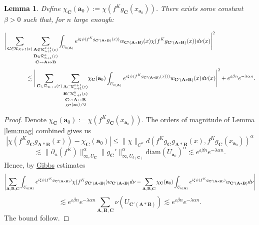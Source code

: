 \documentclass[a4paper]{article}
\newtheorem{lemma}[theorem]{Lemma}
\theoremstyle{definition}
\begin{document}
\begin{lemma}

Define $ \chi_{\mathbf{C}}(\mathbf{a}_0) := \chi(f^K g_{\mathbf{C}}(x_{\mathbf{a}_0}))$. There exists some constant $\beta>0$ such that, for $n$ large enough:

$$  \Bigg{|}\sum_{\mathbf{C} \in \mathcal{R}_{K+1}(\varepsilon)} \underset{\mathbf{C} \rightsquigarrow \mathbf{A} \leftrightarrow \mathbf{B}}{ \underset{ \mathbf{B} \in \mathcal{R}_{n+1}^k(\varepsilon)}{ \underset{\mathbf{A} \in \mathcal{R}_{n+1}^{k+1}(\varepsilon) }{ \sum}} } \int_{U_{b(\mathbf{A})}} e^{i \xi \psi( f^K g_{\mathbf{C}'(\mathbf{A} * \mathbf{B})}(x))} w_{\mathbf{C}'(\mathbf{A} * \mathbf{B})}(x) \chi(f^K g_{\mathbf{C}'(\mathbf{A} * \mathbf{B})}(x)) d\nu(x) \Bigg{|}^2  \quad \quad \quad \quad \quad \quad \quad $$ $$ \quad \quad \quad \quad  \lesssim  \Bigg{|} \sum_{\mathbf{C} \in \mathcal{R}_{K+1}(\varepsilon)} \underset{\chi_{\mathbf{C}}(\mathbf{a}_0) \neq 0}{\underset{\mathbf{C} \rightsquigarrow \mathbf{A} \leftrightarrow \mathbf{B}}{ \underset{ \mathbf{B} \in \mathcal{R}_{n+1}^k(\varepsilon)}{ \underset{\mathbf{A} \in \mathcal{R}_{n+1}^{k+1}(\varepsilon) }{ \sum}} }} \chi_{\mathbf{C}}(\mathbf{a}_0) \int_{U_{b(\mathbf{A})}} e^{i \xi \psi( f^K g_{\mathbf{C}'(\mathbf{A} * \mathbf{B})}(x)))} w_{\mathbf{C}'(\mathbf{A} * \mathbf{B})}(x) d\nu(x) \Bigg{|}^2 + e^{\varepsilon \beta n} e^{- \lambda \alpha n}. $$

\end{lemma}

\begin{proof}
Denote $ \chi_{\mathbf{C}}(\mathbf{a}_0) := \chi(f^K g_{\mathbf{C}}(x_{\mathbf{a}_0})). $ The orders of magnitude of Lemma \ref{lem:mag} combined gives us
$$ \left| \chi(f^K g_{\mathbf{C}} g_{\mathbf{A}*\mathbf{B}}(x)) -  \chi_{\mathbf{C}}(\mathbf{a}_0)  \right| \leq \|\chi\|_{C^\alpha} d\left(f^K g_{\mathbf{C}} g_{\mathbf{A}*\mathbf{B}}(x),f^K g_{\mathbf{C}} (x_{\mathbf{a}_0} ) \right)^\alpha $$ 
$$ \lesssim \|\partial_u (f^K)\|_{\infty,U_{\mathbf{C}}}^\alpha \| g_{\mathbf{C}}' \|_{\infty,U_{b(\mathbf{C})}}^\alpha  \text{diam}(U_{\mathbf{a}_0 })^\alpha  \lesssim e^{\varepsilon \beta n} e^{- \lambda \alpha n} .$$
Hence, by \hyperref[Gibbs]{Gibbs} estimates 
$$ { \Bigg{|} {\sum_{\mathbf{A},\mathbf{B},\mathbf{C}}} \int_{U_{b(\mathbf{A})}} e^{i \xi \psi( f^K g_{\mathbf{C}'(\mathbf{A} * \mathbf{B})} )} \chi( f^K g_{\mathbf{C}'(\mathbf{A} * \mathbf{B})})  w_{\mathbf{C}'(\mathbf{A} * \mathbf{B})} d\nu  -   \sum_{\mathbf{A},\mathbf{B},\mathbf{C}} \chi_{\mathbf{C}}(\mathbf{a}_0)  \int_{U_{b(\mathbf{A})}} e^{i \xi \psi(f^K g_{\mathbf{C}'(\mathbf{A} * \mathbf{B})})} w_{\mathbf{C}'(\mathbf{A} * \mathbf{B})} d\nu \Bigg{|} }$$
$$ \lesssim e^{\varepsilon \beta n} e^{- \lambda \alpha n}  \sum_{\mathbf{A},\mathbf{B},\mathbf{C}} \nu(U_{\mathbf{C}'(\mathbf{A} * \mathbf{B}) }) \lesssim e^{\varepsilon \beta n} e^{- \lambda \alpha n} .$$
The bound follow. \end{proof}
\end{document}
